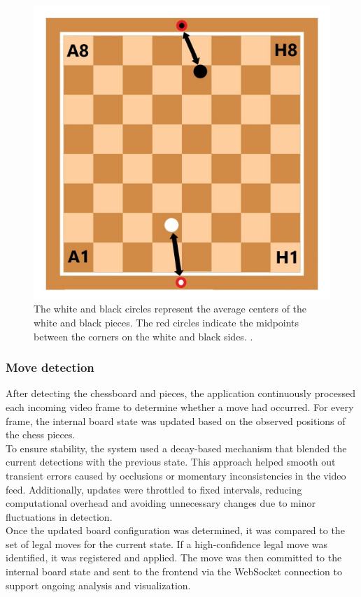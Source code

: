 \begin{figure}[h!]
\centering
\includegraphics[width=0.70\linewidth]{figures/methods/ml-models/label_assignment_board.jpg}
\caption[Assigning labels to chessboard]{The white and black circles represent the average centers of the white and black pieces. The red circles indicate the midpoints between the corners on the white and black sides.  \cite{vectorstock:chessboard-svg}.}
\label{fig:board_label_assignment}
\end{figure}



\subsubsection*{Move detection}

After detecting the chessboard and pieces, the application continuously processed each incoming video frame to determine whether a move had occurred. For every frame, the internal board state was updated based on the observed positions of the chess pieces. \\

To ensure stability, the system used a decay-based mechanism that blended the current detections with the previous state. This approach helped smooth out transient errors caused by occlusions or momentary inconsistencies in the video feed. Additionally, updates were throttled to fixed intervals, reducing computational overhead and avoiding unnecessary changes due to minor fluctuations in detection. \\

Once the updated board configuration was determined, it was compared to the set of legal moves for the current state. If a high-confidence legal move was identified, it was registered and applied. The move was then committed to the internal board state and sent to the frontend via the WebSocket connection to support ongoing analysis and visualization.


